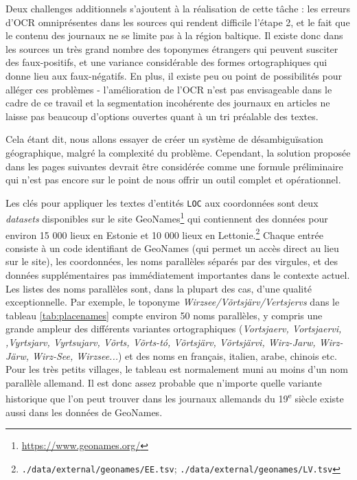 \documentclass[a4paper,twoside,12pt]{article}
\begin{document}
Deux challenges additionnels s'ajoutent à la réalisation de cette tâche : les erreurs d'OCR omniprésentes dans les sources qui rendent difficile l'étape 2, et le fait que le contenu des journaux ne se limite pas à la région baltique. Il existe donc dans les sources un très grand nombre des toponymes \og étrangers \fg{}  qui peuvent susciter des faux-positifs, et une variance considérable des formes ortographiques qui donne lieu aux faux-négatifs. En plus, il existe peu ou point de possibilités pour alléger ces problèmes - l'amélioration de l'OCR n'est pas envisageable dans le cadre de ce travail et la segmentation incohérente des journaux en articles ne laisse pas beaucoup d'options ouvertes quant à un tri préalable des textes.

Cela étant dit, nous allons essayer de créer un système de désambiguïsation géographique, malgré la complexité du problème. Cependant, la solution proposée dans les pages suivantes devrait être considérée comme une formule préliminaire qui n'est pas encore sur le point de nous offrir un outil complet et opérationnel.

Les clés pour appliquer les textes d'entités \texttt{LOC} aux coordonnées sont deux \textit{datasets} disponibles sur le site GeoNames\footnote{\url{https://www.geonames.org/}} qui contiennent des données pour environ 15 000 lieux en Estonie et 10 000 lieux en Lettonie.\footnote{\texttt{./data/external/geonames/EE.tsv}; \texttt{./data/external/geonames/LV.tsv}} Chaque entrée consiste à un code identifiant de GeoNames (qui permet un accès direct au lieu sur le site), les coordonnées, les noms parallèles séparés par des virgules, et des données supplémentaires pas immédiatement importantes dans le contexte actuel. Les listes des noms parallèles sont, dans la plupart des cas, d'une qualité exceptionnelle. Par exemple, le toponyme \textit{Wirzsee/Võrtsjärv/Vertsjervs} dans le tableau \ref{tab:placenames} compte environ 50 noms parallèles, y compris une grande ampleur des différents variantes ortographiques (\textit{Vortsjaerv, Vortsjaervi, ,Vyrtsjarv, Vyrtsujarv, Võrts, Võrts-tó, Võrtsjärv, Võrtsjärvi, Wirz-Jarw, Wirz-Järw, Wirz-See, Wirzsee...}) et des noms en français, italien, arabe, chinois etc. Pour les très petits villages, le tableau est normalement muni au moins d'un nom parallèle allemand. Il est donc assez probable que n'importe quelle variante historique que l'on peut trouver dans les journaux allemands du 19\textsuperscript{e} siècle existe aussi dans les données de GeoNames.
\end{document}
